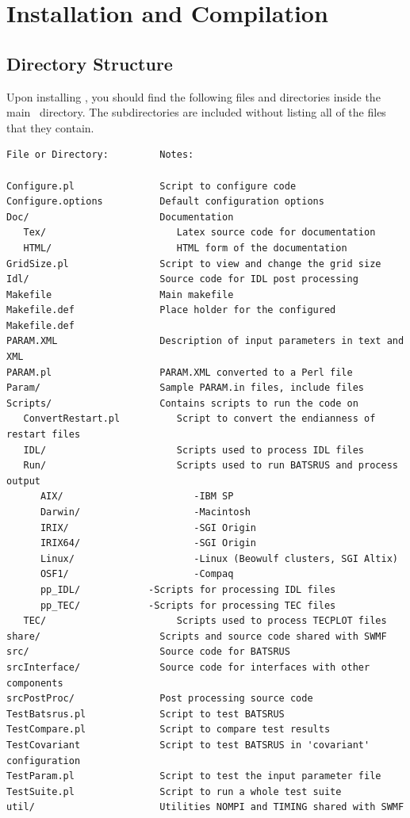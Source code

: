 \section{Installation and Compilation \label{section:install_compile}}

\subsection{Directory Structure \label{section:directory}}

Upon installing \BATSRUS, you should find the following files
and directories inside the main \BATSRUS\ directory.  
The subdirectories are included without listing
all of the files that they contain.
\begin{verbatim}
File or Directory:         Notes:

Configure.pl               Script to configure code
Configure.options          Default configuration options
Doc/                       Documentation 
   Tex/                       Latex source code for documentation
   HTML/                      HTML form of the documentation
GridSize.pl                Script to view and change the grid size
Idl/                       Source code for IDL post processing
Makefile                   Main makefile
Makefile.def               Place holder for the configured Makefile.def
PARAM.XML                  Description of input parameters in text and XML
PARAM.pl                   PARAM.XML converted to a Perl file
Param/                     Sample PARAM.in files, include files
Scripts/                   Contains scripts to run the code on
   ConvertRestart.pl          Script to convert the endianness of restart files
   IDL/                       Scripts used to process IDL files
   Run/                       Scripts used to run BATSRUS and process output
      AIX/                       -IBM SP
      Darwin/                    -Macintosh
      IRIX/                      -SGI Origin
      IRIX64/                    -SGI Origin
      Linux/                     -Linux (Beowulf clusters, SGI Altix)
      OSF1/                      -Compaq
      pp_IDL/			 -Scripts for processing IDL files
      pp_TEC/			 -Scripts for processing TEC files	
   TEC/                       Scripts used to process TECPLOT files
share/                     Scripts and source code shared with SWMF
src/                       Source code for BATSRUS
srcInterface/              Source code for interfaces with other components
srcPostProc/               Post processing source code
TestBatsrus.pl             Script to test BATSRUS
TestCompare.pl             Script to compare test results
TestCovariant              Script to test BATSRUS in 'covariant' configuration
TestParam.pl               Script to test the input parameter file
TestSuite.pl               Script to run a whole test suite
util/                      Utilities NOMPI and TIMING shared with SWMF
\end{verbatim}

